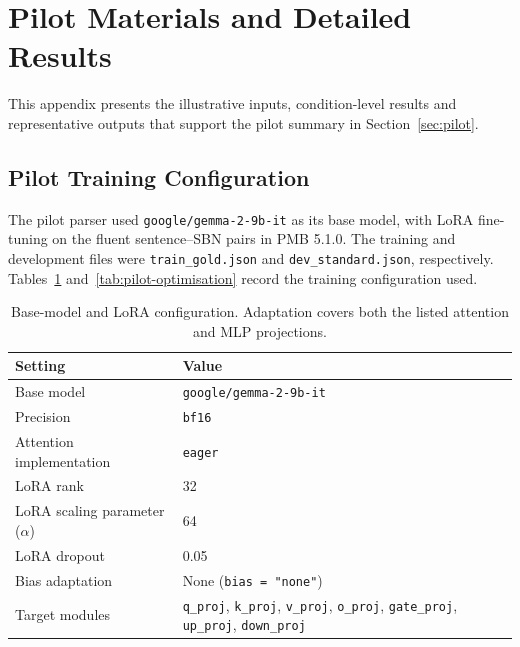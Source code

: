 \section{Pilot Materials and Detailed Results}
\label{app:pilot-results}

This appendix presents the illustrative inputs, condition-level results and
representative outputs that support the pilot summary in
Section~\ref{sec:pilot}.

\subsection{Pilot Training Configuration}
\label{app:pilot-training}

The pilot parser used \texttt{google/gemma-2-9b-it} as its base model,
with LoRA fine-tuning on the fluent sentence--SBN pairs in PMB 5.1.0.
The training and development files were \texttt{train\_gold.json} and
\texttt{dev\_standard.json}, respectively. Tables~\ref{tab:pilot-lora}
and~\ref{tab:pilot-optimisation} record the training configuration used.

\begin{table}[htbp]
\centering
\small
\begin{tabular}{@{}p{}p{}@{}}
\toprule
Setting & Value \\
\midrule
Base model & \texttt{google/gemma-2-9b-it} \\
Precision & \texttt{bf16} \\
Attention implementation & \texttt{eager} \\
LoRA rank & 32 \\
LoRA scaling parameter ($\alpha$) & 64 \\
LoRA dropout & 0.05 \\
Bias adaptation & None (\texttt{bias = "none"}) \\
Target modules & \texttt{q\_proj}, \texttt{k\_proj}, \texttt{v\_proj},
  \texttt{o\_proj}, \texttt{gate\_proj}, \texttt{up\_proj},
  \texttt{down\_proj} \\
\bottomrule
\end{tabular}
\caption{Base-model and LoRA configuration. Adaptation covers both the listed
attention and MLP projections.}
\label{tab:pilot-lora}
\end{table}

